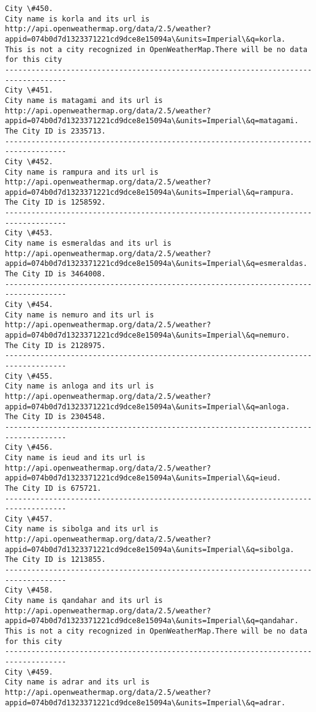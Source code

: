 \documentclass[11pt]{article}
\begin{document}
\begin{Verbatim}[commandchars=\\\{\}]
City \#450.
City name is korla and its url is http://api.openweathermap.org/data/2.5/weather?appid=074b0d7d1323371221cd9dce8e15094a\&units=Imperial\&q=korla.
This is not a city recognized in OpenWeatherMap.There will be no data for this city
------------------------------------------------------------------------------------
City \#451.
City name is matagami and its url is http://api.openweathermap.org/data/2.5/weather?appid=074b0d7d1323371221cd9dce8e15094a\&units=Imperial\&q=matagami.
The City ID is 2335713.
------------------------------------------------------------------------------------
City \#452.
City name is rampura and its url is http://api.openweathermap.org/data/2.5/weather?appid=074b0d7d1323371221cd9dce8e15094a\&units=Imperial\&q=rampura.
The City ID is 1258592.
------------------------------------------------------------------------------------
City \#453.
City name is esmeraldas and its url is http://api.openweathermap.org/data/2.5/weather?appid=074b0d7d1323371221cd9dce8e15094a\&units=Imperial\&q=esmeraldas.
The City ID is 3464008.
------------------------------------------------------------------------------------
City \#454.
City name is nemuro and its url is http://api.openweathermap.org/data/2.5/weather?appid=074b0d7d1323371221cd9dce8e15094a\&units=Imperial\&q=nemuro.
The City ID is 2128975.
------------------------------------------------------------------------------------
City \#455.
City name is anloga and its url is http://api.openweathermap.org/data/2.5/weather?appid=074b0d7d1323371221cd9dce8e15094a\&units=Imperial\&q=anloga.
The City ID is 2304548.
------------------------------------------------------------------------------------
City \#456.
City name is ieud and its url is http://api.openweathermap.org/data/2.5/weather?appid=074b0d7d1323371221cd9dce8e15094a\&units=Imperial\&q=ieud.
The City ID is 675721.
------------------------------------------------------------------------------------
City \#457.
City name is sibolga and its url is http://api.openweathermap.org/data/2.5/weather?appid=074b0d7d1323371221cd9dce8e15094a\&units=Imperial\&q=sibolga.
The City ID is 1213855.
------------------------------------------------------------------------------------
City \#458.
City name is qandahar and its url is http://api.openweathermap.org/data/2.5/weather?appid=074b0d7d1323371221cd9dce8e15094a\&units=Imperial\&q=qandahar.
This is not a city recognized in OpenWeatherMap.There will be no data for this city
------------------------------------------------------------------------------------
City \#459.
City name is adrar and its url is http://api.openweathermap.org/data/2.5/weather?appid=074b0d7d1323371221cd9dce8e15094a\&units=Imperial\&q=adrar.

\end{Verbatim}
\end{document}
